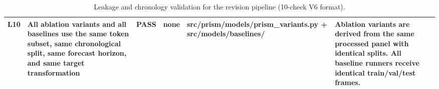 \begin{table}[htbp]
\begin{tabular}{llllll}
L10 & All ablation variants and all baselines use the same token subset, same chronological split, same forecast horizon, and same target transformation & PASS & none & src/prism/models/prism_variants.py + src/models/baselines/ & Ablation variants are derived from the same processed panel with identical splits. All baseline runners receive identical train/val/test frames. \\
\hline
\end{tabular}
\caption{Leakage and chronology validation for the revision pipeline (10-check V6 format).}
\label{leakage_audit_report}
\end{table}